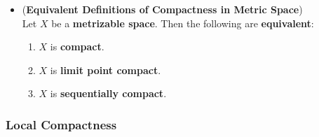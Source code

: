 \documentclass[11pt]{article}
\begin{document}
\begin{itemize}
\item \begin{theorem} (\textbf{Equivalent Definitions of Compactness in Metric Space}) \citep{munkres2000topology}\\
Let $X$ be a \textbf{metrizable space}. Then the following are \textbf{equivalent}:
\begin{enumerate}
\item $X$ is \textbf{compact}.
\item $X$ is \textbf{limit point compact}.
\item $X$ is \textbf{sequentially compact}.
\end{enumerate}
\end{theorem}
\end{itemize}
\subsubsection{Local Compactness}
\end{document}
